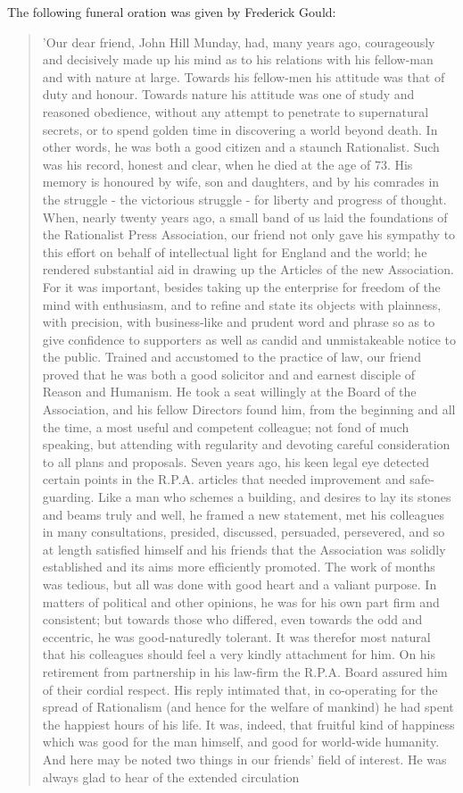 The following funeral oration was given by Frederick Gould:\cite{JohnHillMundayFuneral}
 
\begin{quotation}
'Our dear friend, John Hill Munday, had, many years ago, courageously and decisively made up his mind as to his relations with his fellow-man and with nature at large. Towards his fellow-men his attitude was that of duty and honour. Towards nature his attitude was one of study and reasoned obedience, without any attempt to penetrate to supernatural secrets, or to spend golden time in discovering a world beyond death. In other words, he was both a good citizen and a staunch Rationalist. Such was his record, honest and clear, when he died at the age of 73. His memory is honoured by wife, son and daughters, and by his comrades in the struggle - the victorious struggle - for liberty and progress of thought. When, nearly twenty years ago, a small band of us laid the foundations of the Rationalist Press Association, our friend not only gave his sympathy to this effort on behalf of intellectual light for England and the world; he rendered substantial aid in drawing up the Articles of the new Association. For it was important, besides taking up the enterprise for freedom of the mind with enthusiasm, and to refine and state its objects with plainness, with precision, with business-like and prudent word and phrase so as to give confidence to supporters as well as candid and unmistakeable notice to the public. Trained and accustomed to the practice of law, our friend proved that he was both a good solicitor and and earnest disciple of Reason and Humanism. He took a seat willingly at the Board of the Association, and his fellow Directors found him, from the beginning and all the time, a most useful and competent colleague; not fond of much speaking, but attending with regularity and devoting careful consideration to all plans and proposals. Seven years ago, his keen legal eye detected certain points in the R.P.A. articles that needed improvement and safe-guarding. Like a man who schemes a building, and desires to lay its stones and beams truly and well, he framed a new statement, met his colleagues in many consultations, presided, discussed, persuaded, persevered, and so at length satisfied himself and his friends that the Association was solidly established and its aims more efficiently promoted. The work of months was tedious, but all was done with good heart and a valiant purpose. In matters of political and other opinions, he was for his own part firm and consistent; but towards those who differed, even towards the odd and eccentric, he was good-naturedly tolerant. It was therefor most natural that his colleagues should feel a very kindly attachment for him. On his retirement from partnership in his law-firm the R.P.A. Board assured him of their cordial respect. His reply intimated that, in co-operating for the spread of Rationalism (and hence for the welfare of mankind) he had spent the happiest hours of his life. It was, indeed, that fruitful kind of happiness which was good for the man himself, and good for world-wide humanity. And here may be noted two things in our friends' field of interest. He was always glad to hear of the extended circulation 
\end{quotation}
